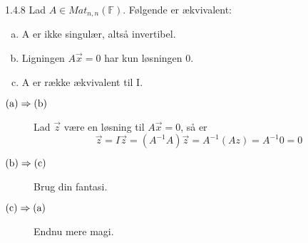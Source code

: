 
\begin{saetning}{1.4.8}
	Lad $A \in Mat_{n,n}(\mathbb{F})$. Følgende er ækvivalent:
	\begin{enumerate}[(a)]
		\item A er ikke singulær, altså invertibel.
		\item Ligningen $A \vec{x} =0$ har kun løsningen $0$.
		\item A er række ækvivalent til I.
	\end{enumerate}
\end{saetning}

\begin{bevis}
	\begin{description}
		\item[$\textmd{(a)} \Rightarrow \textmd{(b)}$]
			Lad $\vec{z}$ være en løsning til $A \vec{x}=0$, så er
			\[
				\vec{z} = I \vec{z} = (A^{-1}A)\vec{z} = A^{-1}(Az)
				= A^{-1}0 = 0
			\]
		\item[$\textmd{(b)} \Rightarrow \textmd{(c)}$] Brug din fantasi.
		\item[$\textmd{(c)} \Rightarrow \textmd{(a)}$] Endnu mere magi.
	\end{description}
\end{bevis}
